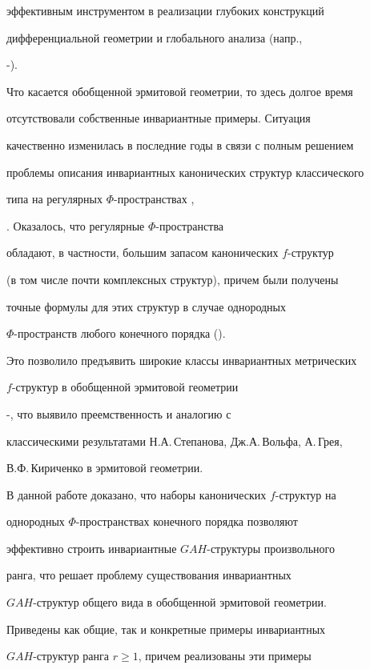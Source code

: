 эффективным инструментом в реализации глубоких конструкций


дифференциальной геометрии и глобального анализа (напр.,


\cite{9}-\cite{12}).





Что касается обобщенной эрмитовой геометрии, то здесь долгое время


отсутствовали собственные инвариантные примеры. Ситуация


качественно изменилась в последние годы в связи с полным решением


проблемы описания инвариантных канонических структур классического


типа на регулярных $\Phi$-пространствах \cite{13},


\cite{14}. Оказалось, что регулярные $\Phi$-простран\-ства


обладают, в частности, большим запасом канонических $f$-структур


(в том числе почти комплексных структур), причем были получены


точные формулы для этих структур в случае однородных


$\Phi$-пространств любого конечного порядка (\cite{13}).


Это позволило предъявить широкие классы инвариантных метрических


$f$-структур в обобщенной эрмитовой геометрии 


\cite{15}-\cite{19}, что выявило преемственность и аналогию с


классическими результатами Н.А.\,Степанова, Дж.А.\,Вольфа, А.\,Грея,


В.Ф.\,Кириченко в эрмитовой геометрии.





В данной работе доказано, что наборы канонических $f$-структур на


однородных $\Phi$-прост\-ран\-ст\-вах конечного порядка позволяют


эффективно строить инвариантные $GAH$-структуры произвольного


ранга, что решает проблему существования инвариантных


$GAH$-структур общего вида в обобщенной эрмитовой геометрии.


Приведены как общие, так и конкретные примеры инвариантных


$GAH$-структур ранга $r\ge {1}$, причем реализованы эти примеры



